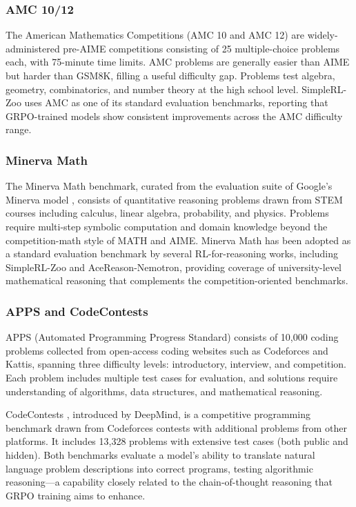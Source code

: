 \documentclass[12pt,a4paper]{report}
\theoremstyle{definition}
\begin{document}
\subsubsection{AMC 10/12}

The American Mathematics Competitions (AMC 10 and AMC 12) are widely-administered pre-AIME competitions consisting of 25 multiple-choice problems each, with 75-minute time limits. AMC problems are generally easier than AIME but harder than GSM8K, filling a useful difficulty gap. Problems test algebra, geometry, combinatorics, and number theory at the high school level. SimpleRL-Zoo \cite{zeng2025simplerl} uses AMC as one of its standard evaluation benchmarks, reporting that GRPO-trained models show consistent improvements across the AMC difficulty range.

\subsubsection{Minerva Math}

The Minerva Math benchmark, curated from the evaluation suite of Google's Minerva model \cite{lewkowycz2022minerva}, consists of quantitative reasoning problems drawn from STEM courses including calculus, linear algebra, probability, and physics. Problems require multi-step symbolic computation and domain knowledge beyond the competition-math style of MATH and AIME. Minerva Math has been adopted as a standard evaluation benchmark by several RL-for-reasoning works, including SimpleRL-Zoo and AceReason-Nemotron, providing coverage of university-level mathematical reasoning that complements the competition-oriented benchmarks.

\subsubsection{APPS and CodeContests}

APPS \cite{hendrycks2021apps} (Automated Programming Progress Standard) consists of 10,000 coding problems collected from open-access coding websites such as Codeforces and Kattis, spanning three difficulty levels: introductory, interview, and competition. Each problem includes multiple test cases for evaluation, and solutions require understanding of algorithms, data structures, and mathematical reasoning.

CodeContests \cite{li2022codecontests}, introduced by DeepMind, is a competitive programming benchmark drawn from Codeforces contests with additional problems from other platforms. It includes 13,328 problems with extensive test cases (both public and hidden). Both benchmarks evaluate a model's ability to translate natural language problem descriptions into correct programs, testing algorithmic reasoning---a capability closely related to the chain-of-thought reasoning that GRPO training aims to enhance.
\end{document}
